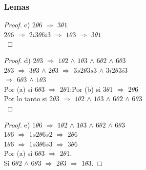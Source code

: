 \documentclass{beamer}
\begin{document}
\begin{frame}
\frametitle{Lemas}
\begin{proof}

    c) $2\theta 6$ $\Rightarrow$ $3\theta 1$\\
       $2\theta 6$ $\Rightarrow$ $2i3\theta 6i3$ $\Rightarrow$ $1\theta 3$ $\Rightarrow$ $3\theta 1$\\
\end{proof}
\begin{proof}
    d) $2\theta 3$ $\Rightarrow$ $1\theta 2$ $\wedge$ $1\theta 3$ $\wedge$ $6\theta 2$
       $\wedge$ $6\theta 3$\\
       $2\theta 3$ $\Rightarrow$ $3\theta 3$ $\wedge$ $2\theta 3$ $\Rightarrow$
       $3s2\theta 3s3$ $\wedge$ $3i2\theta 3i3$\\ 
       $\Rightarrow$ $6\theta 3$ $\wedge$ $1\theta 3$\\
       Por (a) si $6\theta 3$ $\Rightarrow$ $2\theta 1$;Por (b) si $3\theta 1$
       $\Rightarrow$ $2\theta 6$\\
       Por lo tanto si $2\theta 3$ $\Rightarrow$ $1\theta 2$ $\wedge$ $1\theta 3$ $\wedge$ $6\theta 2$
       $\wedge$ $6\theta 3$\\
\end{proof}
\begin{proof}
    e) $1\theta 6$ $\Rightarrow$ $1\theta 2$ $\wedge$ $1\theta 3$ $\wedge$ $6\theta 2$
       $\wedge$ $6\theta 3$\\
       $1\theta 6$ $\Rightarrow$ $1s2\theta 6s2$ $\Rightarrow$ $2\theta 6$\\
       $1\theta 6$ $\Rightarrow$ $1s3\theta 6s3$ $\Rightarrow$ $3\theta 6$\\
       Por (a) si $6\theta 3$ $\Rightarrow$ $2\theta 1$.\\
       Si $6\theta 2$ $\wedge$ $6\theta 3$ $\Rightarrow$ $2\theta 3$
       $\Rightarrow$ $1\theta 3$.
\end{proof}
\end{frame}
\end{document}
